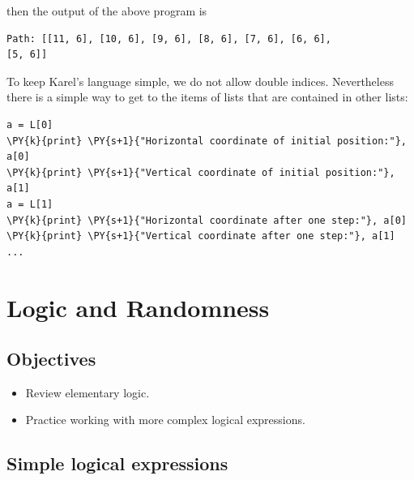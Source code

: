 \noindent
then the output of the above program is\\

\begin{ybox}
\begin{Verbatim}[commandchars=\\\{\}]
Path: [[11, 6], [10, 6], [9, 6], [8, 6], [7, 6], [6, 6], 
[5, 6]]
\end{Verbatim}
\end{ybox}
\vspace{6mm}

\noindent
To keep Karel's language simple, we do not allow double indices. Nevertheless
there is a simple way to get to the items of lists that are contained in other lists:\\

\begin{bbox}
\begin{Verbatim}[commandchars=\\\{\}]
a = L[0]
\PY{k}{print} \PY{s+1}{"Horizontal coordinate of initial position:"}, a[0]
\PY{k}{print} \PY{s+1}{"Vertical coordinate of initial position:"}, a[1]
a = L[1]
\PY{k}{print} \PY{s+1}{"Horizontal coordinate after one step:"}, a[0]
\PY{k}{print} \PY{s+1}{"Vertical coordinate after one step:"}, a[1]
...
\end{Verbatim}
\end{bbox}


\section{Logic and Randomness} \label{sec:logic} 

\subsection[\ \ Objectives]{Objectives} 
 
\begin{itemize}
\item Review elementary logic.
\item Practice working with more complex logical expressions.
\end{itemize}

\subsection[\ \ Simple logical expressions]{Simple logical expressions}

